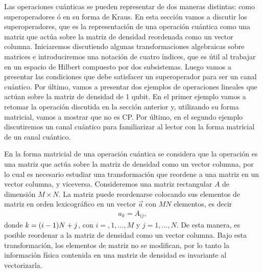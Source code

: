 Las operaciones cuánticas se pueden representar de dos 
maneras distintas: como superoperadores ó  en su forma
de Kraus. En esta sección vamos a discutir los superoperadores, 
que es la representación de una operación cuántica como 
una matriz que actúa sobre la matriz de densidad reordenada
como un vector columna.
Iniciaremos discutiendo algunas
transformaciones algebraicas sobre matrices e introduciremos 
una notación de cuatro índices, que es útil al trabajar en un espacio de Hilbert 
compuesto por dos subsistemas. Luego vamos a presentar 
las condiciones que debe satisfacer un superoperador para ser un 
canal cuántico. Por último, vamos a presentar dos ejemplos de operaciones
lineales que actúan sobre la matriz de densidad de 1 qubit. En el primer 
ejemplo vamos a retomar la operación discutida en la sección anterior y, 
utilizando su forma matricial, vamos a mostrar que no es CP. 
Por último, en el segundo ejemplo discutiremos un canal cuántico
para familiarizar al lector con la forma matricial de un canal cuántico.

En la forma matricial de una operación cuántica se 
considera que la operación es una matriz que actúa sobre la matriz de densidad 
como un vector columna, por lo cual es necesario estudiar una 
transformación que reordene a una matriz en un vector columna, y viceversa.
Consideremos una matriz rectangular $A$ de dimensión $M\times N$.
La matriz puede reordenarse colocando sus elementos de matriz en 
orden lexicográfico en un vector $\vec{a}$ con $MN$ elementos, es decir
\begin{align}
a_k=A_{ij}, 
\label{eq:matrix-to-vector}
\end{align}
donde $k=\qty(i-1)N+j$, con $i=,1,\ldots,M$ y $j=1,\ldots,N$. De
esta manera, es posible reordenar a la matriz de densidad como un 
vector columna. Bajo esta transformación, los elementos de matriz no se 
modifican, por lo tanto la información física contenida en una matriz 
de densidad es invariante al vectorizarla.

